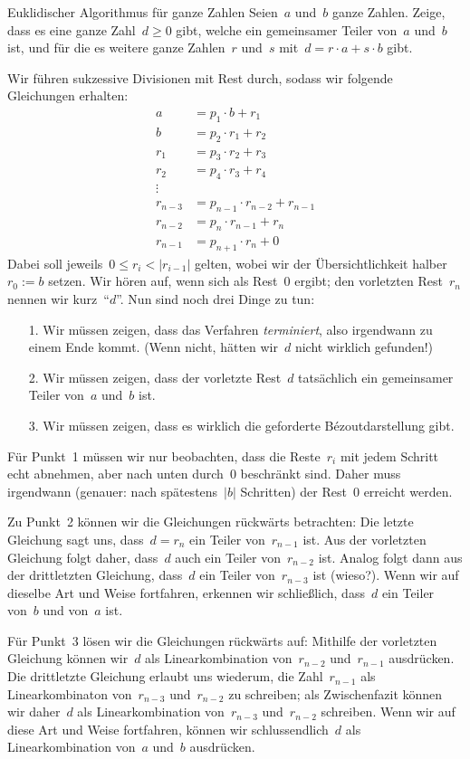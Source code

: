\documentclass{algblatt}
\begin{document}
\begin{aufgabe}{Euklidischer Algorithmus für ganze Zahlen}
Seien~$a$ und~$b$ ganze Zahlen. Zeige, dass es eine ganze Zahl~$d
\geq 0$ gibt, welche ein gemeinsamer Teiler von~$a$ und~$b$ ist, und für die es
weitere ganze Zahlen~$r$ und~$s$ mit~$d = r \cdot a + s \cdot b$ gibt.

\begin{loesung}
Wir führen sukzessive Divisionen mit Rest durch, sodass wir folgende
Gleichungen erhalten:
\begin{align*}
  a &= p_1 \cdot b + r_1 \\
  b &= p_2 \cdot r_1 + r_2 \\
  r_1 &= p_3 \cdot r_2 + r_3 \\
  r_2 &= p_4 \cdot r_3 + r_4 \\
  \vdots \\
  r_{n-3} &= p_{n-1} \cdot r_{n-2} + r_{n-1} \\
  r_{n-2} &= p_{n} \cdot r_{n-1} + r_{n} \\
  r_{n-1} &= p_{n+1} \cdot r_{n} + 0
\end{align*}
Dabei soll jeweils~$0 \leq r_i < |r_{i-1}|$ gelten, wobei wir der
Übersichtlichkeit halber~$r_0 := b$ setzen. Wir hören auf, wenn sich als
Rest~$0$ ergibt; den vorletzten Rest~$r_n$ nennen wir kurz~"`$d$"'. Nun sind
noch drei Dinge zu tun:
\begin{enumerate}
\item[1.] Wir müssen zeigen, dass das Verfahren \emph{terminiert}, also
irgendwann zu einem Ende kommt. (Wenn nicht, hätten wir~$d$ nicht wirklich
gefunden!)
\item[2.] Wir müssen zeigen, dass der vorletzte Rest~$d$ tatsächlich ein
gemeinsamer Teiler von~$a$ und~$b$ ist.
\item[3.] Wir müssen zeigen, dass es wirklich die geforderte Bézoutdarstellung
gibt.
\end{enumerate}
Für Punkt~1 müssen wir nur beobachten, dass die Reste~$r_i$ mit jedem Schritt
echt abnehmen, aber nach unten durch~$0$ beschränkt sind. Daher muss
irgendwann (genauer: nach spätestens~$|b|$ Schritten) der Rest~$0$
erreicht werden.

Zu Punkt~2 können wir die Gleichungen rückwärts betrachten: Die letzte
Gleichung sagt uns, dass~$d = r_n$ ein Teiler von~$r_{n-1}$ ist. Aus der
vorletzten Gleichung folgt daher, dass~$d$ auch ein Teiler von~$r_{n-2}$ ist.
Analog folgt dann aus der drittletzten Gleichung, dass~$d$ ein Teiler
von~$r_{n-3}$ ist (wieso?). Wenn wir auf dieselbe Art und Weise fortfahren,
erkennen wir schließlich, dass~$d$ ein Teiler von~$b$ und von~$a$ ist.

Für Punkt~3 lösen wir die Gleichungen rückwärts auf: Mithilfe der vorletzten
Gleichung können wir~$d$ als Linearkombination von~$r_{n-2}$ und~$r_{n-1}$
ausdrücken. Die drittletzte Gleichung erlaubt uns wiederum, die Zahl~$r_{n-1}$
als Linearkombinaton von~$r_{n-3}$ und~$r_{n-2}$ zu schreiben; als
Zwischenfazit können wir daher~$d$ als Linearkombination von~$r_{n-3}$
und~$r_{n-2}$ schreiben. Wenn wir auf diese Art und Weise fortfahren, können
wir schlussendlich~$d$ als Linearkombination von~$a$ und~$b$ ausdrücken.
\end{loesung}
\end{aufgabe}
 
\end{document}
